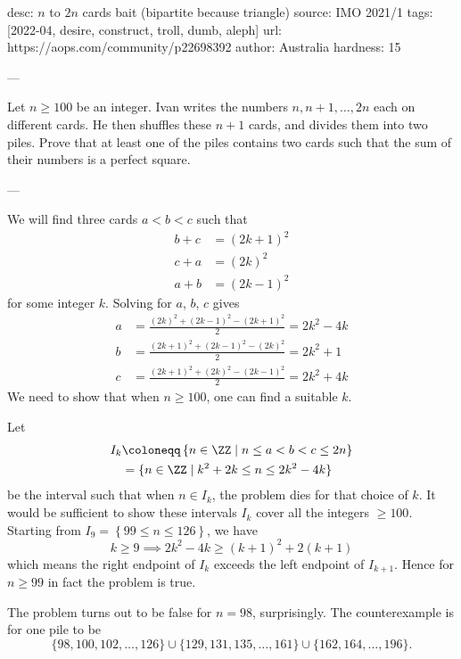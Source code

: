 desc: $n$ to $2n$ cards bait (bipartite because triangle)
source: IMO 2021/1
tags: [2022-04, desire, construct, troll, dumb, aleph]
url: https://aops.com/community/p22698392
author: Australia
hardness: 15

---

Let $n \ge 100$ be an integer.
Ivan writes the numbers $n, n+1, \dots, 2n$ each on different cards.
He then shuffles these $n+1$ cards, and divides them into two piles.
Prove that at least one of the piles contains two cards such that
the sum of their numbers is a perfect square.

---

We will find three cards $a < b < c$ such that
\begin{align*}
  b+c &= (2k+1)^2 \\
  c+a &= (2k)^2 \\
  a+b &= (2k-1)^2
\end{align*}
for some integer $k$.
Solving for $a$, $b$, $c$ gives
\begin{align*}
  a &= \frac{(2k)^2+(2k-1)^2-(2k+1)^2}{2} = 2k^2 - 4k \\
  b &= \frac{(2k+1)^2+(2k-1)^2-(2k)^2}{2} = 2k^2 + 1 \\
  c &= \frac{(2k+1)^2+(2k)^2-(2k-1)^2}{2} = 2k^2 + 4k
\end{align*}
We need to show that when $n \ge 100$, one can find a suitable $k$.

Let
\begin{align*}
  I_k &\coloneqq \left\{ n \in \ZZ \mid n \le a < b < c \le 2n \right\} \\
  &= \{ n \in \ZZ \mid k^2+2k \le n \le  2k^2-4k \}
\end{align*}
be the interval such that when $n \in I_k$,
the problem dies for that choice of $k$.
It would be sufficient to show these intervals $I_k$
cover all the integers $\ge 100$.
Starting from $I_9 = \left\{ 99 \le n \le 126 \right\}$,
we have
\[ k \ge 9 \implies 2k^2 - 4k \ge (k+1)^2 + 2(k+1) \]
which means the right endpoint of $I_k$
exceeds the left endpoint of $I_{k+1}$.
Hence for $n \ge 99$ in fact the problem is true.

\begin{remark*}
  The problem turns out to be false for $n = 98$, surprisingly.
  The counterexample is for one pile to be
  \[ \{98,100,102,\dots,126\}
    \cup \{129,131,135,\dots,161 \}
    \cup \{162, 164, \dots, 196\}. \]
\end{remark*}
